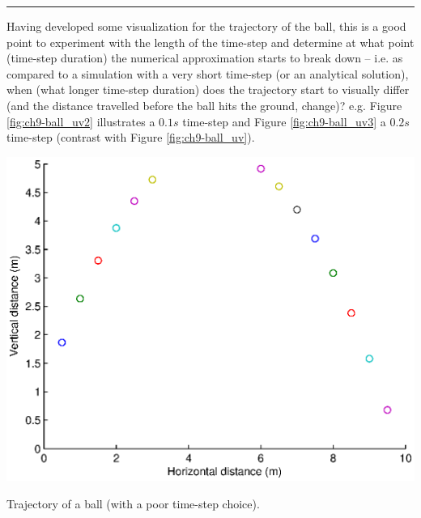 \documentclass{tufte-book} %
\begin{document}
\vspace{1mm}
\noindent\rule{4cm}{0.5pt}
\vspace{1mm}

\noindent Having developed some visualization for the trajectory of the ball, this is a good point to experiment with the length of the time-step and determine at what point (time-step duration) the numerical approximation starts to break down -- i.e. as compared to a simulation with a very short time-step (or an analytical solution), when (what longer time-step duration) does the trajectory start to visually differ (and the distance travelled before the ball hits the ground, change)? e.g. Figure \ref{fig:ch9-ball_uv2} illustrates a \(0.1s\) time-step and Figure \ref{fig:ch9-ball_uv3} a \(0.2s\) time-step (contrast with Figure \ref{fig:ch9-ball_uv}).

\begin{marginfigure}[-2.25in]
\includegraphics[width=\linewidth]{ch9-ball_uv2.eps}
\caption{Trajectory of a ball (with a poor time-step choice).}
\label{fig:ch9-ball_uv2}
\end{marginfigure}
\end{document}
